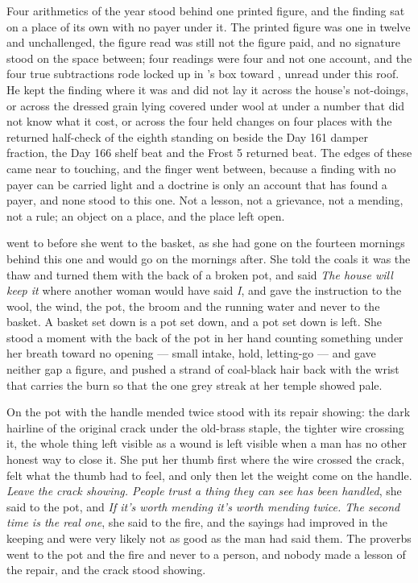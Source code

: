 Four arithmetics of the year stood behind one printed figure, and the finding sat on a place of its own with no payer under it. The printed figure was one in twelve and unchallenged, the figure read was still not the figure paid, and no signature stood on the space between; four readings were four and not one account, and the four true subtractions rode locked up  in 's box toward , unread under this roof. He kept the finding where it was and did not lay it across the house's not-doings, or across the dressed grain lying covered under wool at  under a number that did not know what it cost, or across the four held changes on four places with the returned half-check of the eighth standing on  beside the Day 161 damper fraction, the Day 166 shelf beat and the Frost 5 returned beat. The edges of these came near to touching, and the finger went between, because a finding with no payer can be carried light and a doctrine is only an account that has found a payer, and none stood to this one. Not a lesson, not a grievance, not a mending, not a rule; an object on a place, and the place left open.

\scenebreak

 went to  before she went to the basket, as she had gone on the fourteen mornings behind this one and would go on the mornings after. She told the coals it was the thaw and turned them with the back of a broken pot, and said \emph{The house will keep it} where another woman would have said \emph{I}, and gave the instruction to the wool, the wind, the pot, the broom and the running water and never to the basket. A basket set down is a pot set down, and a pot set down is left. She stood a moment with the back of the pot in her hand counting something under her breath toward no opening --- small intake, hold, letting-go --- and gave neither gap a figure, and pushed a strand of coal-black hair back with the wrist that carries the burn so that the one grey streak at her temple showed pale.

On  the pot with the handle mended twice stood with its repair showing: the dark hairline of the original crack under the old-brass staple, the tighter wire crossing it, the whole thing left visible as a wound is left visible when a man has no other honest way to close it. She put her thumb first where the wire crossed the crack, felt what the thumb had to feel, and only then let the weight come on the handle. \emph{Leave the crack showing. People trust a thing they can see has been handled}, she said to the pot, and \emph{If it's worth mending it's worth mending twice. The second time is the real one}, she said to the fire, and the sayings had improved in the keeping and were very likely not as good as the man had said them. The proverbs went to the pot and the fire and never to a person, and nobody made a lesson of the repair, and the crack stood showing.

